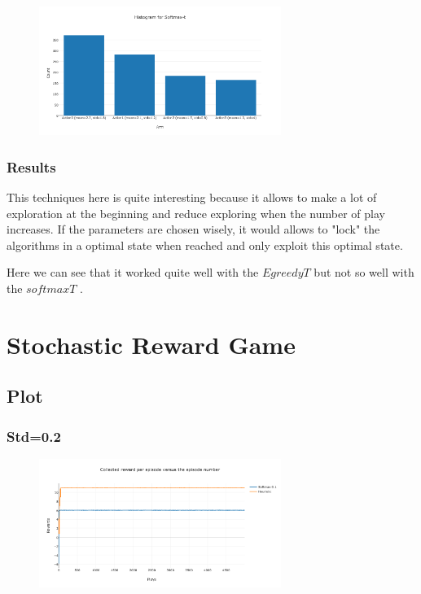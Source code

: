 \documentclass[11pt]{article}
\begin{document}
\begin{figure}[H]
   \centering
   \includegraphics[width=0.7\textwidth]{img/1-3/h2.png}
\end{figure}

\subsubsection{Results}

This techniques here is quite interesting because it allows to make a lot of exploration at the beginning and reduce exploring when the number of play increases. If the parameters are chosen wisely, it would allows to "lock" the algorithms in a optimal state when reached and only exploit this optimal state.

Here we can see that it worked quite well with the $Egreedy T$ but not so well with the $softmax T$ .

\section{Stochastic Reward Game}


\subsection{Plot}

\subsubsection{Std=0.2}

\begin{figure}[H]
   \centering
   \includegraphics[width=0.7\textwidth]{img/2/1.png}
\end{figure}
\end{document}
